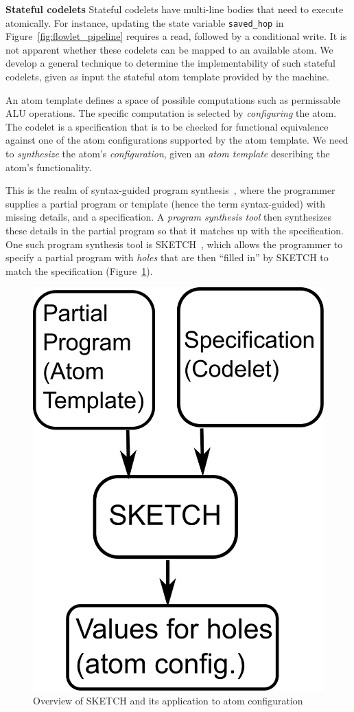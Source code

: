 \textbf{Stateful codelets}
Stateful codelets have multi-line bodies that need to execute atomically. For
instance, updating the state variable \texttt{saved\_hop} in
Figure~\ref{fig:flowlet_pipeline} requires a read, followed by a conditional write.  It
is not apparent whether these codelets can be mapped to an available atom. We
develop a general technique to determine the implementability of such stateful
codelets, given as input the stateful atom template provided by the \absmachine
machine.

An atom template defines a space of possible computations such as
permissable ALU operations.  The specific computation is selected by
\textit{configuring} the atom. The codelet is a specification that is to be
checked for functional equivalence against one of the atom configurations
supported by the atom template. We need to \textit{synthesize} the atom's
\textit{configuration}, given an \textit{atom template} describing the atom's
functionality.

This is the realm of syntax-guided program synthesis~\cite{sgsyn}, where the
programmer supplies a partial program or template (hence the term
syntax-guided) with missing details, and a specification. A \textit{program
synthesis tool} then synthesizes these details in the partial program so that
it matches up with the specification. One such program synthesis tool is
SKETCH~\cite{bitstreaming, sketch_asplos, sketch_manual}, which allows the
programmer to specify a partial program with \textit{holes} that are then
``filled in'' by SKETCH to match the specification (Figure~\ref{fig:sketch}).

\begin{figure}[!b]
  \begin{center}
  \includegraphics[width=0.4\columnwidth]{sketch.pdf}
  \caption{Overview of SKETCH and its application to atom configuration}
  \label{fig:sketch}
  \end{center}
\end{figure}

